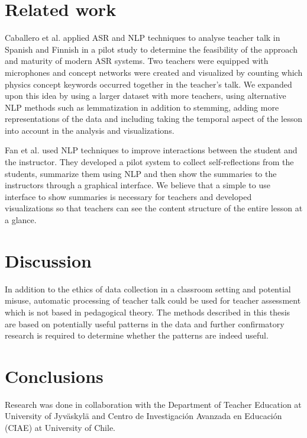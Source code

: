 \documentclass[utf8,english]{gradu3}
\begin{document}



\chapter{Related work}

Caballero et al. \parencite*{caballeroASRClassroomToday2017} applied ASR and NLP techniques to analyse teacher talk in Spanish and Finnish in a pilot study to determine the feasibility of the approach and maturity of modern ASR systems. Two teachers were equipped with microphones and concept networks were created and visualized by counting which physics concept keywords occurred together in the teacher's talk. We expanded upon this idea by using a larger dataset with more teachers, using alternative NLP methods such as lemmatization in addition to stemming, adding more representations of the data and including taking the temporal aspect of the lesson into account in the analysis and visualizations.

Fan et al. \parencite*{fanCourseMIRROREnhancingLarge2015} used NLP techniques to improve interactions between the student and the instructor. They developed a pilot system to collect self-reflections from the students, summarize them using NLP and then show the summaries to the instructors through a graphical interface. We believe that a simple to use interface to show summaries is necessary for teachers and developed visualizations so that teachers can see the content structure of the entire lesson at a glance.


\chapter{Discussion}






In addition to the ethics of data collection in a classroom setting and potential misuse, automatic processing of teacher talk could be used for teacher assessment which is not based in pedagogical theory. The methods described in this thesis are based on potentially useful patterns in the data and further confirmatory research is required to determine whether the patterns are indeed useful.

\chapter{Conclusions}





Research was done in collaboration with the Department of Teacher Education at University of Jyväskylä and Centro de Investigación Avanzada en Educación (CIAE) at University of Chile.
 
\printbibliography
\end{document}
